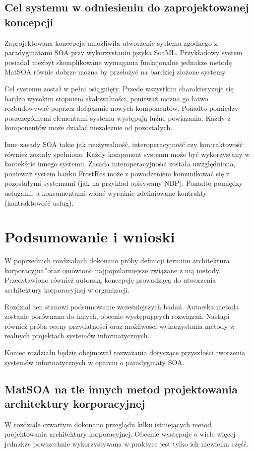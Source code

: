 \section{Cel systemu w odniesieniu do zaprojektowanej koncepcji}
Zaprojektowana koncepcja umożliwiła utworzenie systemu zgodnego z paradygmatami SOA przy wykorzystaniu języka SoaML. Przykładowy system posiadał niezbyt skomplikowane wymagania funkcjonalne jednakże metodę MatSOA równie dobrze można by przełożyć na bardziej złożone systemy.

Cel systemu został w pełni osiągnięty. Przede wszystkim charakteryzuje się bardzo wysokim stopniem skalowalności, ponieważ można go łatwo rozbudowywać poprzez dołączanie nowych komponentów. Ponadto pomiędzy poszczególnymi elementami systemu występują luźne powiązania. Każdy z komponentów może działać niezależnie od pozostałych.

Inne zasady SOA takie jak reużywalność, interoperacyjność czy kontraktowość również zostały spełnione. Każdy komponent systemu może być wykorzystany w kontekście innego systemu. Zasada interoperacyjności została uwzględniona, ponieważ system banku FrostRes może z powodzeniem komunikować się z pozostałymi systemami (jak na przykład opisywany NBP). Ponadto pomiędzy usługami, a konsumentami widać wyraźnie zdefiniowane kontrakty (kontraktowość usług).

\chapter{Podsumowanie i wnioski}
W poprzednich rozdziałach dokonano próby definicji terminu \quotedblbase architektura korporacyjna\textquotedblright oraz omówiono najpopularniejsze związane z nią metody. Przedstawiono również autorską koncepcję prowadzącą do utworzenia architektury korporacyjnej w organizacji. 

Rozdział ten stanowi podsumowanie wcześniejszych badań. Autorska metoda zostanie porównana do innych, obecnie występujących rozwiązań. Nastąpi również próba oceny przydatności oraz możliwości wykorzystania metody w realnych projektach systemów informatycznych.

Koniec rozdziału będzie obejmował rozważania dotyczące przyszłości tworzenia systemów informatycznych w oparciu o paradygmaty SOA.

\section{MatSOA na tle innych metod projektowania architektury korporacyjnej}
W rozdziale czwartym dokonano przeglądu kilku istniejących metod projektowania architektury korporacyjnej. Obecnie występuje o wiele więcej jednakże powszechnie wykorzystywana w praktyce jest tylko ich niewielka część.

